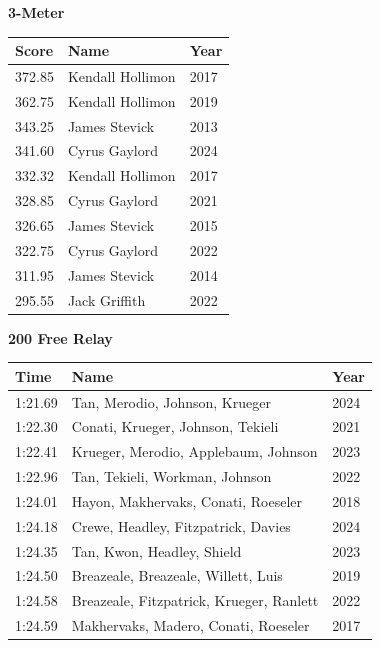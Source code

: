 \hfill
\begin{minipage}[t]{0.48\textwidth}
\centering
\textbf{\textcolor{teamprimary}{3-Meter}}\par
\vspace{0.5em}
\centering
\small
\renewcommand{\arraystretch}{1.0}
\setlength{\tabcolsep}{4pt}
\begin{tabular}{@{}p{1.8cm}p{3.0cm}p{1.0cm}@{}}
\toprule
\textbf{Score} & \textbf{Name} & \textbf{Year} \\
\midrule
372.85 & Kendall Hollimon & 2017 \\
362.75 & Kendall Hollimon & 2019 \\
343.25 & James Stevick & 2013 \\
341.60 & Cyrus Gaylord & 2024 \\
332.32 & Kendall Hollimon & 2017 \\
328.85 & Cyrus Gaylord & 2021 \\
326.65 & James Stevick & 2015 \\
322.75 & Cyrus Gaylord & 2022 \\
311.95 & James Stevick & 2014 \\
295.55 & Jack Griffith & 2022 \\
\bottomrule
\end{tabular}
\end{minipage}
\vspace{1.2em}
\noindent\begin{minipage}[t]{0.98\textwidth}
\centering
\textbf{\textcolor{teamprimary}{200 Free Relay}}\par
\vspace{0.5em}
\centering
\small
\renewcommand{\arraystretch}{1.0}
\setlength{\tabcolsep}{4pt}
\begin{tabular}{@{}p{4.5cm}p{8.5cm}p{2.5cm}@{}}
\toprule
\textbf{Time} & \textbf{Name} & \textbf{Year} \\
\midrule
1:21.69 & Tan, Merodio, Johnson, Krueger & 2024 \\
1:22.30 & Conati, Krueger, Johnson, Tekieli & 2021 \\
1:22.41 & Krueger, Merodio, Applebaum, Johnson & 2023 \\
1:22.96 & Tan, Tekieli, Workman, Johnson & 2022 \\
1:24.01 & Hayon, Makhervaks, Conati, Roeseler & 2018 \\
1:24.18 & Crewe, Headley, Fitzpatrick, Davies & 2024 \\
1:24.35 & Tan, Kwon, Headley, Shield & 2023 \\
1:24.50 & Breazeale, Breazeale, Willett, Luis & 2019 \\
1:24.58 & Breazeale, Fitzpatrick, Krueger, Ranlett & 2022 \\
1:24.59 & Makhervaks, Madero, Conati, Roeseler & 2017 \\
\bottomrule
\end{tabular}
\end{minipage}
